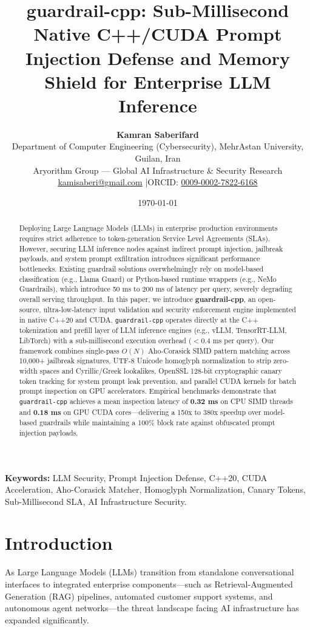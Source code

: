 \documentclass[11pt,a4paper]{article}
\title{\Large\bfseries guardrail-cpp: Sub-Millisecond Native C++/CUDA Prompt Injection Defense and Memory Shield for Enterprise LLM Inference}
\author{
    \textbf{Kamran Saberifard}\\[4pt]
    Department of Computer Engineering (Cybersecurity), MehrAstan University, Guilan, Iran\\
    Aryorithm Group — Global AI Infrastructure \& Security Research\\
    \href{mailto:kamisaberi@gmail.com}{kamisaberi@gmail.com} \quad|\quad ORCID: \href{https://orcid.org/0009-0002-7822-6168}{0009-0002-7822-6168}
}
\date{\today}
\begin{document}
\maketitle

\begin{abstract}
\noindent Deploying Large Language Models (LLMs) in enterprise production environments requires strict adherence to token-generation Service Level Agreements (SLAs). However, securing LLM inference nodes against indirect prompt injection, jailbreak payloads, and system prompt exfiltration introduces significant performance bottlenecks. Existing guardrail solutions overwhelmingly rely on model-based classification (e.g., Llama Guard) or Python-based runtime wrappers (e.g., NeMo Guardrails), which introduce 50 ms to 200 ms of latency per query, severely degrading overall serving throughput. In this paper, we introduce \textbf{guardrail-cpp}, an open-source, ultra-low-latency input validation and security enforcement engine implemented in native C++20 and CUDA. \texttt{guardrail-cpp} operates directly at the C++ tokenization and prefill layer of LLM inference engines (e.g., vLLM, TensorRT-LLM, LibTorch) with a sub-millisecond execution overhead ($<0.4$ ms per query). Our framework combines single-pass $O(N)$ Aho-Corasick SIMD pattern matching across 10,000+ jailbreak signatures, UTF-8 Unicode homoglyph normalization to strip zero-width spaces and Cyrillic/Greek lookalikes, OpenSSL 128-bit cryptographic canary token tracking for system prompt leak prevention, and parallel CUDA kernels for batch prompt inspection on GPU accelerators. Empirical benchmarks demonstrate that \texttt{guardrail-cpp} achieves a mean inspection latency of \textbf{0.32 ms} on CPU SIMD threads and \textbf{0.18 ms} on GPU CUDA cores—delivering a 150x to 380x speedup over model-based guardrails while maintaining a 100\% block rate against obfuscated prompt injection payloads.
\end{abstract}

\vspace{6pt}
\noindent\textbf{Keywords:} LLM Security, Prompt Injection Defense, C++20, CUDA Acceleration, Aho-Corasick Matcher, Homoglyph Normalization, Canary Tokens, Sub-Millisecond SLA, AI Infrastructure Security.

\hr

\section{Introduction}
As Large Language Models (LLMs) transition from standalone conversational interfaces to integrated enterprise components—such as Retrieval-Augmented Generation (RAG) pipelines, automated customer support systems, and autonomous agent networks—the threat landscape facing AI infrastructure has expanded significantly. 
\end{document}
